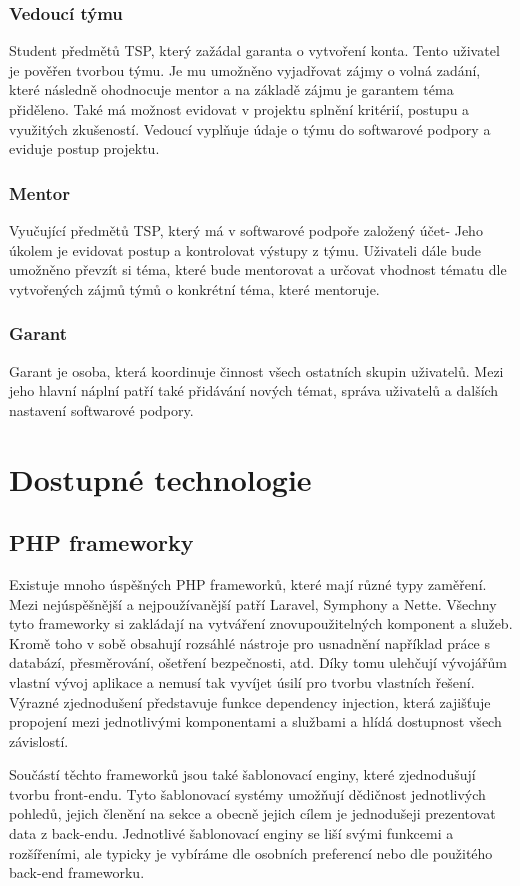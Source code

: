 \documentclass[czech,BP]{thesiskiv}
\begin{document}
	\subsection{Vedoucí týmu}
		\par Student předmětů TSP, který zažádal garanta o vytvoření konta. Tento uživatel je pověřen tvorbou týmu. Je mu umožněno vyjadřovat zájmy o volná zadání, které následně ohodnocuje mentor a na základě zájmu je garantem téma přiděleno. Také má možnost evidovat v projektu splnění kritérií, postupu a využitých zkušeností. Vedoucí vyplňuje údaje o týmu do softwarové podpory a eviduje postup projektu.
	\subsection{Mentor}
		\par Vyučující předmětů TSP, který má v softwarové podpoře založený účet- Jeho úkolem je evidovat postup a kontrolovat výstupy z týmu. Uživateli dále bude umožněno převzít si téma, které bude mentorovat a určovat vhodnost tématu dle vytvořených zájmů týmů o konkrétní téma, které mentoruje.
	\subsection{Garant}
		\par Garant je osoba, která koordinuje činnost všech ostatních skupin uživatelů. Mezi jeho hlavní náplní patří také přidávání nových témat, správa uživatelů a dalších nastavení softwarové podpory.

\chapter{Dostupné technologie}
\section{PHP frameworky}
	\par Existuje mnoho úspěšných PHP frameworků, které mají různé typy zaměření. Mezi nejúspěšnější a nejpoužívanější patří Laravel, Symphony a Nette. Všechny tyto frameworky si zakládají na vytváření znovupoužitelných komponent a služeb. Kromě toho v sobě obsahují rozsáhlé nástroje pro usnadnění například práce s databází, přesměrování, ošetření bezpečnosti, atd. Díky tomu ulehčují vývojářům vlastní vývoj aplikace a nemusí tak vyvíjet úsilí pro tvorbu vlastních řešení. Výrazné zjednodušení představuje funkce dependency injection, která zajišťuje propojení mezi jednotlivými komponentami a službami a hlídá dostupnost všech závislostí.
	\par Součástí těchto frameworků jsou také šablonovací enginy, které zjednodušují tvorbu front-endu. Tyto šablonovací systémy umožňují dědičnost jednotlivých pohledů, jejich členění na sekce a obecně jejich cílem je jednodušeji prezentovat data z back-endu. Jednotlivé šablonovací enginy se liší svými funkcemi a rozšířeními, ale typicky je vybíráme dle osobních preferencí nebo dle použitého back-end frameworku.
\end{document}
